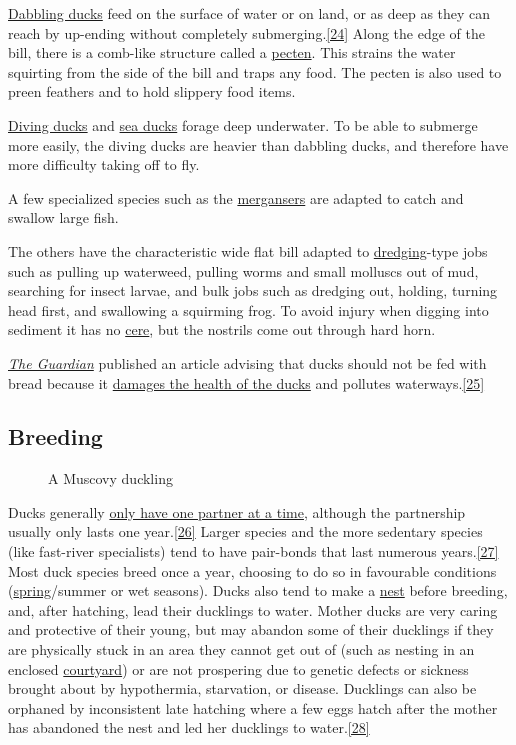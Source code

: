 \documentclass[11pt,a4paper]{article}
\begin{document}
\href{/wiki/Dabbling\_duck}{Dabbling ducks} feed on the surface of water or on land, or as deep as they can reach by up-ending without completely submerging.\href{\#cite\_note-24}{[24]} Along the edge of the bill, there is a comb-like structure called a \href{/wiki/Pecten\_\%28biology\%29}{pecten}. This strains the water squirting from the side of the bill and traps any food. The pecten is also used to preen feathers and to hold slippery food items.

\href{/wiki/Diving\_duck}{Diving ducks} and \href{/wiki/Sea\_duck}{sea ducks} forage deep underwater. To be able to submerge more easily, the diving ducks are heavier than dabbling ducks, and therefore have more difficulty taking off to fly.

A few specialized species such as the \href{/wiki/Merganser}{mergansers} are adapted to catch and swallow large fish.

The others have the characteristic wide flat bill adapted to \href{/wiki/Dredging}{dredging}-type jobs such as pulling up waterweed, pulling worms and small molluscs out of mud, searching for insect larvae, and bulk jobs such as dredging out, holding, turning head first, and swallowing a squirming frog. To avoid injury when digging into sediment it has no \href{/wiki/Cere}{cere}, but the nostrils come out through hard horn.

\href{/wiki/The\_Guardian}{\textit{The Guardian}} published an article advising that ducks should not be fed with bread because it \href{/wiki/Angel\_wing}{damages the health of the ducks} and pollutes waterways.\href{\#cite\_note-25}{[25]}

\subsection{Breeding}

\begin{figure}[h]
\caption{A Muscovy duckling}
\end{figure}

Ducks generally \href{/wiki/Monogamy\_in\_animals}{only have one partner at a time}, although the partnership usually only lasts one year.\href{\#cite\_note-26}{[26]} Larger species and the more sedentary species (like fast-river specialists) tend to have pair-bonds that last numerous years.\href{\#cite\_note-27}{[27]} Most duck species breed once a year, choosing to do so in favourable conditions (\href{/wiki/Spring\_\%28season\%29}{spring}/summer or wet seasons). Ducks also tend to make a \href{/wiki/Bird\_nest}{nest} before breeding, and, after hatching, lead their ducklings to water. Mother ducks are very caring and protective of their young, but may abandon some of their ducklings if they are physically stuck in an area they cannot get out of (such as nesting in an enclosed \href{/wiki/Courtyard}{courtyard}) or are not prospering due to genetic defects or sickness brought about by hypothermia, starvation, or disease. Ducklings can also be orphaned by inconsistent late hatching where a few eggs hatch after the mother has abandoned the nest and led her ducklings to water.\href{\#cite\_note-28}{[28]}
\end{document}
